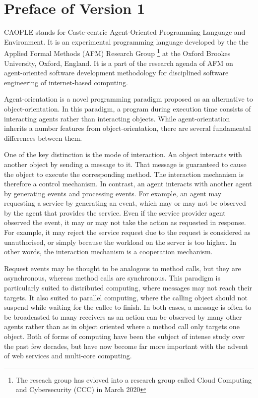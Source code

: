 
\chapter*{Preface of Version 1}

CAOPLE stands for Caste-centric Agent-Oriented Programming Language
and Environment. It is an experimental programming language developed 
by the the Applied Formal Methods (AFM) Research Group \footnote{The reseach 
group has evloved into a research group called Cloud Computing and Cybersecurity 
(CCC) in March 2020} at the Oxford 
Brookes University, Oxford, England. It is a part of the research agenda of  
AFM on agent-oriented software development methodology for disciplined 
software engineering of internet-based computing. 

Agent-orientation is a novel programming paradigm proposed as an 
alternative to object-orientation. In this paradigm,
a program during execution time consists of interacting agents rather
than interacting objects. While agent-orientation inherits a number 
features from object-orientation, there are several fundamental 
differences between them. 

One of the key distinction is the mode of interaction.
An object interacts with another object by sending a message to it.
That message is guaranteed to cause the object to execute the corresponding
method. The interaction mechanism is therefore a control mechanism. In contrast, an
agent interacts with another agent by generating events and processing events. 
For example, an agent may requesting a service by generating an event, which 
may or may not be observed by the agent that provides the service. Even if the 
service provider agent observed the event, it may or may not take the action as 
requested in response. For example, it may reject the service request due to 
the request is considered as unauthorised, or simply because the workload on 
the server is too higher. In other words, the interaction mechanism is a cooperation 
mechanism. 

Request events may be thought to be analogous to method calls, but they are
asynchronous, whereas method calls are synchronous. This
paradigm is particularly suited to distributed computing, where messages
may not reach their targets. It also suited to parallel computing, where the calling
object should not suspend while waiting for the callee to finish. In both cases, a 
message is often to be broadcasted to many receivers as an action can be 
observed by many other agents rather than as in object oriented where 
a method call only targets one object. 
Both of forms of computing have been the subject of intense
study over the past few decades, but have now become far more important
with the advent of web services and multi-core computing.

